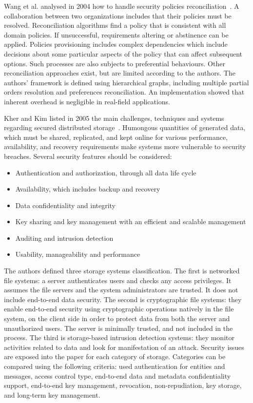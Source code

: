 Wang et al. analysed in 2004 how to handle security policies reconciliation~\cite{wang_security_2004}. A collaboration between two organizations includes that their policies must be resolved. Reconciliation algorithms find a policy that is consistent with all domain policies. If unsuccessful, requirements altering or abstinence can be applied. Policies provisioning includes complex dependencies which include decisions about some particular aspects of the policy that can affect subsequent options. Such processes are also subjects to preferential behaviours. Other reconciliation approaches exist, but are limited according to the authors. The authors' \gls{framework} is defined using hierarchical graphs, including multiple partial orders resolution and preferences reconciliation. An implementation showed that inherent overhead is negligible in real-field applications. %

Kher and Kim listed in 2005 the main challenges, techniques and systems regarding secured distributed storage~\cite{kher_securing_2005}. Humongous quantities of generated data, which must be shared, replicated, and kept online for various performance, availability, and recovery requirements make systems more vulnerable to security breaches. Several security features should be considered:
\begin{itemize}
	\item Authentication and authorization, through all data life cycle
	\item Availability, which includes backup and recovery
	\item Data confidentiality and integrity
	\item Key sharing and key management with an efficient and scalable management
	\item Auditing and intrusion detection
	\item Usability, manageability and performance
\end{itemize}
The authors defined three storage systems classification. The first is networked file systems: a server authenticates users and checks any access privileges. It assumes the file servers and the system administrators are trusted. It does not include end-to-end data security. The second is cryptographic file systems: they enable end-to-end security using cryptographic operations natively in the file system, on the client side in order to protect data from both the server and unauthorized users. The server is minimally trusted, and not included in the process. The third is storage-based intrusion detection systems: they monitor activities related to data and look for manifestation of an attack. Security issues are exposed into the paper for each category of storage. Categories can be compared using the following criteria: used authentication for entities and messages, access control type, end-to-end data and \gls{metadata} confidentiality support, end-to-end key management, revocation, non-repudiation, key storage, and long-term key management. %

